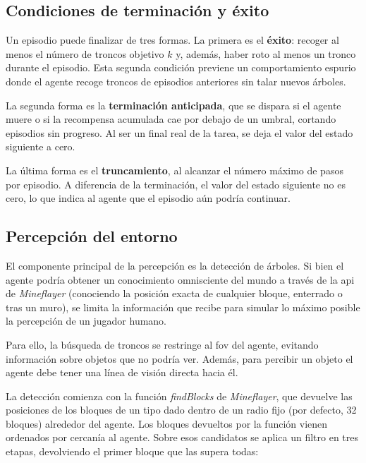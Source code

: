 \subsection{Condiciones de terminación y éxito}
Un episodio puede finalizar de tres formas. La primera es el \textbf{éxito}: recoger al menos el
número de troncos objetivo $k$ y, además, haber roto al menos
un tronco durante el episodio. Esta segunda condición previene un comportamiento espurio
donde el agente recoge troncos de episodios anteriores sin talar nuevos árboles.

La segunda forma es la \textbf{terminación anticipada}, que se dispara si el agente muere o si la
recompensa acumulada cae por debajo de un umbral, cortando episodios sin progreso. Al ser un final
real de la tarea, se deja el valor del estado siguiente a cero.

La última forma es el \textbf{truncamiento}, al alcanzar el número máximo de
pasos por episodio. A diferencia de la terminación, el valor del estado siguiente no es cero,
lo que indica al agente que el episodio aún podría continuar.

\subsection{Percepción del entorno}
El componente principal de la percepción es la detección de árboles. Si bien el agente
podría obtener un conocimiento omnisciente del mundo a través de la \acrshort{api} de \textit{Mineflayer} (conociendo la
posición exacta de cualquier bloque, enterrado o tras un muro), se limita
la información que recibe para simular lo máximo posible la percepción de un jugador humano.

Para ello, la búsqueda de troncos se restringe al
\gls{fov} del agente, evitando información sobre objetos
que no podría ver. Además, para percibir un objeto el agente debe tener una línea de
visión directa hacia él.

La detección comienza con la función \textit{findBlocks} de \textit{Mineflayer}, que devuelve
las posiciones de los bloques de un tipo dado dentro de un radio fijo (por defecto, \num{32} bloques)
alrededor del agente. Los bloques devueltos por la función vienen ordenados por cercanía al agente. Sobre esos candidatos se aplica un
filtro en tres etapas, devolviendo el primer bloque que las supera todas:

